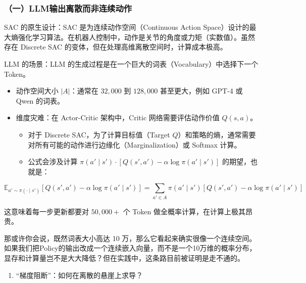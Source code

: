 \hypertarget{ux4e00llmux8f93ux51faux79bbux6563ux800cux975eux8fdeux7eedux52a8ux4f5c}{%
\subsubsection{（一）LLM输出离散而非连续动作}\label{ux4e00llmux8f93ux51faux79bbux6563ux800cux975eux8fdeux7eedux52a8ux4f5c}}

SAC 的原生设计：SAC 是为连续动作空间（Continuous Action Space）设计的最大熵强化学习算法。在机器人控制中，动作是关节的角度或力矩（实数值）。虽然存在 Discrete SAC 的变体，但在处理高维离散空间时，计算成本极高。

LLM 的场景：LLM 的生成过程是在一个巨大的词表（Vocabulary）中选择下一个 Token。

\begin{itemize}
\tightlist
\item
  动作空间大小 \(|A|\)：通常在 \(32,000\) 到 \(128,000\) 甚至更大，例如 GPT-4 或 Qwen 的词表。
\item
  维度灾难：在 Actor-Critic 架构中，Critic 网络需要评估动作价值 \(Q(s,a)\)。

  \begin{itemize}
  \tightlist
  \item
    对于 Discrete SAC，为了计算目标值（Target \(Q\)）和策略的熵，通常需要对所有可能的动作进行边缘化（Marginalization）或 Softmax 计算。
  \item
{}
    公式会涉及计算 \(\pi(a' \mid s') \cdot [Q(s',a') - \alpha \log \pi(a' \mid s')]\) 的期望，也就是：
  \end{itemize}
\end{itemize}

\[
\mathbb{E}_{a'\sim \pi(\cdot \mid s')}
\left[
Q(s',a')-\alpha\log\pi(a'\mid s')
\right]
=
\sum_{a'\in A}\pi(a'\mid s')
\left[
Q(s',a')-\alpha\log\pi(a'\mid s')
\right]
\]

这意味着每一步更新都要对 \(50,000+\) 个 Token 做全概率计算，在计算上极其昂贵。

那或许你会说，既然词表大小高达 10 万，那么它看起来确实很像一个连续空间。如果我们把Policy的输出改成一个连续嵌入向量，而不是一个10万维的概率分布，显存和计算量岂不是大大降低？但在实践中，这条路目前被证明是走不通的。

\begin{enumerate}
\def\labelenumi{\arabic{enumi}.}
\tightlist
\item
  ``梯度阻断''：如何在离散的悬崖上求导？
\end{enumerate}

